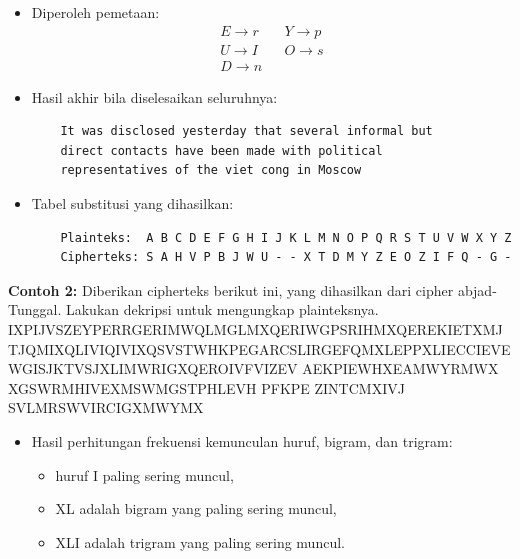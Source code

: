 \documentclass{article}
\begin{document}
\begin{itemize}
    \item Diperoleh pemetaan:
    \[ 
    \begin{aligned}
    E \rightarrow r && Y \rightarrow p \\
    U \rightarrow I && O \rightarrow s \\
    D \rightarrow n && 
    \end{aligned}
    \]
    \vspace{5mm}
    \item Hasil akhir bila diselesaikan seluruhnya:
    \begin{verbatim}
    It was disclosed yesterday that several informal but
    direct contacts have been made with political
    representatives of the viet cong in Moscow
    \end{verbatim}
    \vspace{5mm}
    \item Tabel substitusi yang dihasilkan:
    \begin{verbatim}
    Plainteks:  A B C D E F G H I J K L M N O P Q R S T U V W X Y Z
    Cipherteks: S A H V P B J W U - - X T D M Y Z E O Z I F Q - G -
    \end{verbatim}
\end{itemize}

\newpage


\textbf{Contoh 2:} Diberikan cipherteks berikut ini, yang dihasilkan dari cipher abjad-Tunggal. Lakukan dekripsi untuk mengungkap plainteksnya.\\
\nLIVITCSWPIYVEWHEVSRIQMXLEYVEOIEWHRXEXIPFEMVEWHKVSTYLXZIX\nLIKI IXPIJVSZEYPERRGERIMWQLMGLMXQERIWGPSRIHMXQEREKIETXMJT\nPRGEVEKEITREWHEXXLEXXMZITWAWSQWXSWEXTVEPMRXRSJGSTVRIEYVI\nEXCVUMIWERGMIWXMJMGCSMWXSW JQMIXQLIVIQIVIXQSVSTWHKPEGARCS\nXRWIEWSWIIBXVIZMXFSJXLIKEGAEWHEPSWYSWIWIEVXLISXLIVLX LIRGE\nPIRQIVIIBGIIHMWYPFLEVHEWHYPSRR FQMXLEPPXLIECCIEVEWGISJKTV\nWMRLIHYSPHXLIQIMYLX SJXLIMWRIGXQEROIVFVIZEV AEKPIEWHXEAMWY\nEPPXLMWY RMWX XGSWRMHIVEXMSWMGSTPHLEVH PFKPE ZINTCMXIVJ SVLMR\nSCMWM SWVIRCIGXMWYMX

\newpage


\begin{itemize}
  \item Hasil perhitungan frekuensi kemunculan huruf, bigram, dan trigram:
  \begin{itemize}
    \item huruf I paling sering muncul,
    \item XL adalah bigram yang paling sering muncul,
    \item XLI adalah trigram yang paling sering muncul.
  \end{itemize}
\end{itemize}
\end{document}
